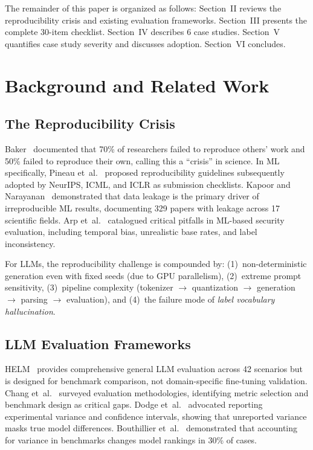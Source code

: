 \documentclass[review,3p]{elsarticle}
\begin{document}
The remainder of this paper is organized as follows: Section~II reviews the reproducibility crisis and existing evaluation frameworks. Section~III presents the complete 30-item checklist. Section~IV describes 6 case studies. Section~V quantifies case study severity and discusses adoption. Section~VI concludes.

\section{Background and Related Work}

\subsection{The Reproducibility Crisis}
Baker~\cite{baker2016} documented that 70\% of researchers failed to reproduce others' work and 50\% failed to reproduce their own, calling this a ``crisis'' in science. In ML specifically, Pineau et~al.~\cite{pineau2021} proposed reproducibility guidelines subsequently adopted by NeurIPS, ICML, and ICLR as submission checklists. Kapoor and Narayanan~\cite{kapoor2023} demonstrated that data leakage is the primary driver of irreproducible ML results, documenting 329 papers with leakage across 17 scientific fields. Arp et~al.~\cite{arp2022} catalogued critical pitfalls in ML-based security evaluation, including temporal bias, unrealistic base rates, and label inconsistency.

For LLMs, the reproducibility challenge is compounded by: (1)~non-deterministic generation even with fixed seeds (due to GPU parallelism), (2)~extreme prompt sensitivity, (3)~pipeline complexity (tokenizer $\to$ quantization $\to$ generation $\to$ parsing $\to$ evaluation), and (4)~the failure mode of \emph{label vocabulary hallucination}.

\subsection{LLM Evaluation Frameworks}
HELM~\cite{liang2022} provides comprehensive general LLM evaluation across 42 scenarios but is designed for benchmark comparison, not domain-specific fine-tuning validation. Chang et~al.~\cite{chang2024} surveyed evaluation methodologies, identifying metric selection and benchmark design as critical gaps. Dodge et~al.~\cite{dodge2019} advocated reporting experimental variance and confidence intervals, showing that unreported variance masks true model differences. Bouthillier et~al.~\cite{bouthillier2021} demonstrated that accounting for variance in benchmarks changes model rankings in 30\% of cases.
\end{document}
